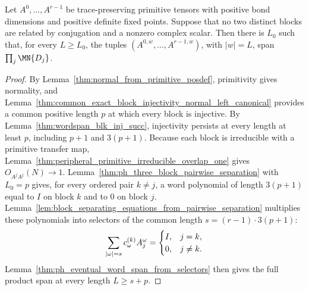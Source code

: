 \begin{lemma}
    \label{thm:ph_primitive_blocks_word_span}
    \leanok
    Let $A^0,\ldots,A^{r-1}$ be trace-preserving primitive tensors with
    positive bond dimensions and positive definite fixed points.
    Suppose that no two distinct blocks are related by conjugation and a
    nonzero complex scalar. Then there is $L_0$ such that, for every $L\ge L_0$,
    the tuples $(A^{0,w},\ldots,A^{r-1,w})$, with $|w|=L$, span
    $\prod_j\MN{D_j}$.
\end{lemma}
\begin{proof}
    \leanok
    By Lemma~\ref{thm:normal_from_primitive_posdef}, primitivity gives
    normality, and
    Lemma~\ref{thm:common_exact_block_injectivity_normal_left_canonical}
    provides a common positive length $p$ at which every block is injective.
    By Lemma~\ref{thm:wordspan_blk_inj_succ}, injectivity persists at every
    length at least $p$, including $p+1$ and $3(p+1)$. Because each block is
    irreducible with a primitive transfer map,
    Lemma~\ref{thm:peripheral_primitive_irreducible_overlap_one} gives
    $O_{A^jA^j}(N)\to1$.
    Lemma~\ref{thm:ph_three_block_pairwise_separation} with
    $L_0=p$ gives, for every ordered pair $k\ne j$, a word polynomial of
    length $3(p+1)$ equal to $I$ on block $k$ and to $0$ on block $j$.
    Lemma~\ref{lem:block_separating_equations_from_pairwise_separation}
    multiplies these polynomials into selectors of the common length
    $s=(r-1)\cdot3(p+1)$:
    \begin{align}
        \sum_{|\omega|=s}c_\omega^{(k)}A_j^\omega=
        \begin{cases}
            I, & j=k,    \\
            0, & j\ne k.
        \end{cases}
        \notag
    \end{align}
    Lemma~\ref{thm:ph_eventual_word_span_from_selectors} then gives the full
    product span at every length $L\ge s+p$.
\end{proof}

